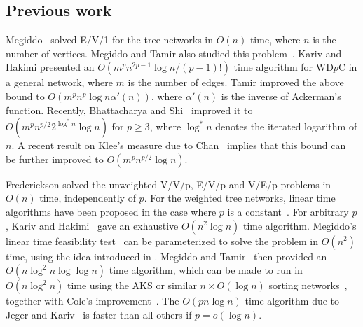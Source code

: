 \documentclass{llncs}
\begin{document}
\subsection{Previous work}
Megiddo~\cite{megiddo1983a} solved E/V/1 for the tree networks
in $O(n)$ time,
where $n$ is the number of vertices.
Megiddo and Tamir also studied this problem~\cite{megiddo1983c}.
Kariv and Hakimi \cite{kariv1979b} presented
an $O(m^p n^{2p-1} \log n/(p\!-\!1)!)$ time algorithm for WD$p$C in a general network,
where $m$ is the number of edges.
Tamir \cite{tamir1988} improved the above bound to $O(m^p n^p \log n\alpha'(n))$,
where $\alpha'(n)$ is the inverse of Ackerman's function.
Recently, Bhattacharya and Shi~\cite{bhattacharya2014b} improved it to
$O(m^pn^{p/2}2^{\log ^*n}\log n)$ for $p\geq 3$,
where $\log ^* n$ denotes the iterated logarithm of $n$.
A recent result on Klee's measure due to Chan~\cite{chan2013} implies that
this bound can be further improved to $O(m^pn^{p/2}\log n)$.



Frederickson \cite{frederickson1990,frederickson1991b} solved the unweighted
V/V/p, E/V/p and V/E/p problems in $O(n)$ time, independently of $p$.
For the weighted tree networks, linear time algorithms have been proposed
in the case where $p$ is a constant~\cite{benmoshe2006,shi2008}.
For arbitrary $p$, Kariv and Hakimi~\cite{kariv1979b} gave an exhaustive $O(n^2\log n)$ time
algorithm.
Megiddo's linear time feasibility test~\cite{megiddo1981} can be parameterized
to solve the problem in $O(n^2)$ time,
using the idea introduced in \cite{megiddo1981}.
Megiddo and Tamir~\cite{megiddo1983c} then provided
an $O(n\log^2 n\log\log n)$ time algorithm,
which can be made to run in $O(n\log^2n)$ time using the AKS or similar
$n \times O(\log n)$ sorting networks~\cite{ajtai1983,goodrich2014,seiferas2009},
together with Cole's improvement~\cite{cole1987}.
The $O(pn \log n)$ time algorithm due to Jeger and Kariv~\cite{jeger1985}
is faster than all others if $p =o(\log n)$.
\end{document}
